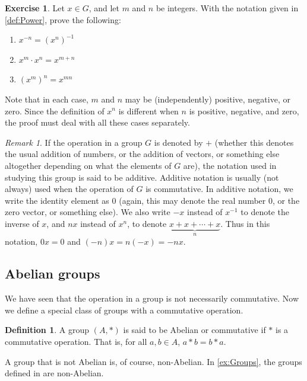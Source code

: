 \documentclass[svgnames]{article}
\theoremstyle{definition}
\newtheorem{Definition}[Definition]{Definition}
\newtheorem{Exercise}{Exercise}[section]
\theoremstyle{remark}
\newtheorem*{Remark*}{Remark}
\newcommand{\newterm}[1]{{\color{alertcolor} #1}}
\begin{document}
\begin{Exercise}
Let $x \in G$, and let $m$ and $n$ be integers. With the notation given in \cref{def:Power}, prove the following:
\begin{enumerate}[label = (\roman*)]
\item $x^{-n} = (x^n)^{-1}$
\item $x^m \cdot x^n = x^{m + n}$
\item $(x^m)^n = x^{mn}$
\end{enumerate}
Note that in each case, $m$ and $n$ may be (independently) positive, negative, or zero. Since the definition of $x^n$ is different when $n$ is positive, negative, and zero, the proof must deal with all these cases separately.
\end{Exercise}

\begin{Remark*}
If the operation in a group $G$ is denoted by $+$ (whether this denotes the usual addition of numbers, or the addition of vectors, or something else altogether depending on what the elements of $G$ are), the notation used in studying this group is said to be \newterm{additive}. Additive notation is usually (not always) used when the operation of $G$ is commutative. In additive notation, we write the identity element as $0$ (again, this may denote the real number $0$, or the zero vector, or something else). We also write $-x$ instead of $x^{-1}$ to denote the inverse of $x$, and $nx$ instead of $x^n$, to denote $\underbrace{x + x + \cdots + x}_n$. Thus in this notation, $0x = 0$ and $(-n)x = n(-x) = -nx$.
\end{Remark*}

\subsection{Abelian groups}\label{subsec:AbGrps}

We have seen that the operation in a group is not necessarily commutative. Now we define a special class of groups with a commutative operation.

\begin{Definition}
A group $(A, *)$ is said to be \newterm{Abelian} or \newterm{commutative} if $*$ is a commutative operation. That is, for all $a, b \in A$, $a * b = b * a$.
\end{Definition}

A group that is not Abelian is, of course, \newterm{non-Abelian}. In \cref{ex:Groups}, the groups defined in  are non-Abelian.
\end{document}
